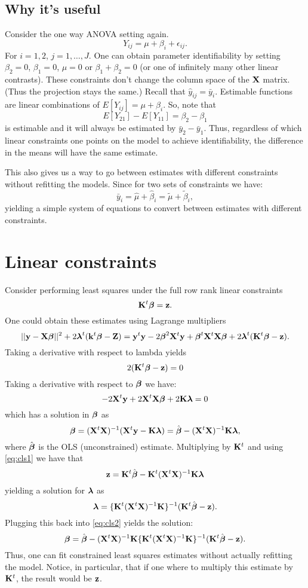 \subsection{Why it's useful}

Consider the one way ANOVA setting again. 
$$
Y_{ij} = \mu + \beta_i + \epsilon_{ij}.
$$
For $i = 1, 2$, $j = 1, \ldots, J$. 
One can obtain parameter identifiability by setting $\beta_2 = 0$, $\beta_1 = 0$, $\mu = 0$ or $\beta_1 + \beta_2 = 0$ (or one of infinitely many other linear contrasts). 
These constraints don't change the column space of the $\mathbf{X}$ matrix. (Thus the projection stays the same.)
Recall that $\hat y_{ij} = \bar y_i$. Estimable functions are linear combinations of $E[Y_{ij}] = \mu + \beta_i$. So, note that
$$
E[Y_{21}] - E[Y_{11}] = \beta_2 - \beta_1
$$
is estimable and it will always be estimated by $\bar y_2 - \bar y_1$. Thus, regardless of which linear constraints one points on the
model to achieve identifiability, the difference in the means will have the same estimate. 

This also gives us a way to go between estimates with different constraints without refitting the models. Since for two sets
of constraints we have:
$$
\bar y_i  = \hat \mu + \hat \beta_i = \tilde \mu + \tilde \beta_i,
$$
yielding a simple system of equations to convert between estimates with different constraints.


\section{Linear constraints}
Consider performing least squares under the full row rank linear constraints 
$$
\mathbf{K}^t \boldsymbol{\beta} = \mathbf{z}.
$$
One could obtain these estimates using Lagrange multipliers
$$
||\mathbf{y} - \mathbf{X} \boldsymbol{\beta}||^2 + 2 \boldsymbol{\lambda}^t (\mathbf{k}^t \boldsymbol{\beta} - \mathbf{Z})
= \mathbf{y}^t \mathbf{y} - 2\boldsymbol{\beta}^2 \mathbf{X}^t \mathbf{y} + \boldsymbol{\beta}^t \mathbf{X}^t \mathbf{X} \boldsymbol{\beta} + 2 \boldsymbol{\lambda}^t (\mathbf{K}^t \boldsymbol{\beta} - \mathbf{z}).
$$
Taking a derivative with respect to lambda yields
\begin{equation}
\label{eq:cls1}
2 (\mathbf{K}^t \boldsymbol{\beta} - \mathbf{z}) = 0
\end{equation}
Taking a derivative with respect to $\boldsymbol{\beta}$ we have:
$$
-2 \mathbf{X}^t \mathbf{y} + 2 \mathbf{X}^t \mathbf{X} \boldsymbol{\beta} + 2 \mathbf{K} \boldsymbol{\lambda}   = 0
$$
which has a solution in $\boldsymbol{\beta}$ as
\begin{equation}
\label{eq:cls2}
\boldsymbol{\beta} = (\mathbf{X}^t \mathbf{X})^{-1} (\mathbf{X}^t \mathbf{y}  -   \mathbf{K} \boldsymbol{\lambda}) = \hat {\boldsymbol{\beta}} - (\mathbf{X}^t \mathbf{X})^{-1} \mathbf{K} \boldsymbol{\lambda},
\end{equation}
where $\hat {\boldsymbol{\beta}}$ is the OLS (unconstrained) estimate.
Multiplying by $\mathbf{K}^t$ and using \eqref{eq:cls1} we have that
$$
\mathbf{z} = \mathbf{K}^t \hat {\boldsymbol{\beta}} - \mathbf{K}^t (\mathbf{X}^t \mathbf{X})^{-1} \mathbf{K} \boldsymbol{\lambda}
$$
yielding a solution for $\boldsymbol{\lambda}$ as
$$
\boldsymbol{\lambda} = \{\mathbf{K}^t (\mathbf{X}^t \mathbf{X})^{-1} \mathbf{K}\}^{-1} (\mathbf{K}^t \hat {\boldsymbol{\beta}} - \mathbf{z}). 
$$
Plugging this back into \eqref{eq:cls2} yields the solution:
$$
\boldsymbol{\beta} = \hat {\boldsymbol{\beta}} -  (\mathbf{X}^t \mathbf{X})^{-1} \mathbf{K} \{\mathbf{K}^t (\mathbf{X}^t \mathbf{X})^{-1} \mathbf{K}\}^{-1} (\mathbf{K}^t \hat {\boldsymbol{\beta}} - \mathbf{z}).
$$
Thus, one can fit constrained least squares estimates without actually refitting the model.
Notice, in particular, that if one where to multiply this estimate by $\mathbf{K}^t$, the result would be
$\mathbf{z}$.

